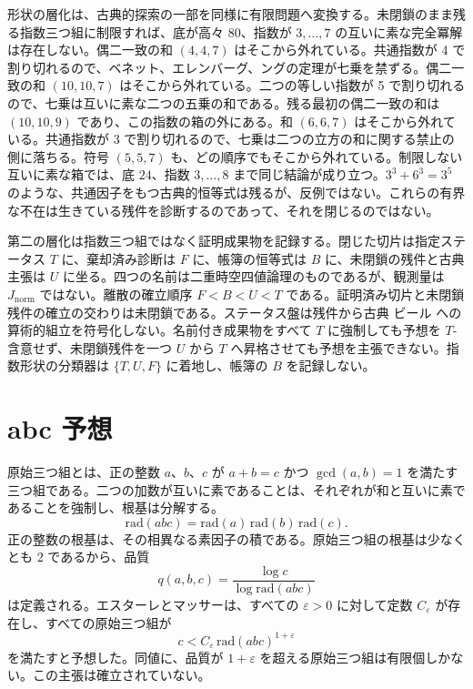 \documentclass[a4paper]{article}
\theoremstyle{definition}
\theoremstyle{remark}
\newcommand{\Jnorm}{J_{\mathrm{norm}}}
\begin{document}
形状の層化は、古典的探索の一部を同様に有限問題へ変換する。未閉鎖のまま残る指数三つ組に制限すれば、底が高々 \(80\)、指数が \(3,\ldots,7\) の互いに素な完全冪解は存在しない。偶二一致の和 \( (4,4,7) \) はそこから外れている。共通指数が 4 で割り切れるので、ベネット、エレンバーグ、ングの定理が七乗を禁ずる。偶二一致の和 \( (10,10,7) \) はそこから外れている。二つの等しい指数が 5 で割り切れるので、七乗は互いに素な二つの五乗の和である。残る最初の偶二一致の和は \( (10,10,9) \) であり、この指数の箱の外にある。和 \( (6,6,7) \) はそこから外れている。共通指数が 3 で割り切れるので、七乗は二つの立方の和に関する禁止の側に落ちる。符号 \( (5,5,7) \) も、どの順序でもそこから外れている。制限しない互いに素な箱では、底 \(24\)、指数 \(3,\ldots,8\) まで同じ結論が成り立つ。\(3^3+6^3=3^5\) のような、共通因子をもつ古典的恒等式は残るが、反例ではない。これらの有界な不在は生きている残件を診断するのであって、それを閉じるのではない。

第二の層化は指数三つ組ではなく証明成果物を記録する。閉じた切片は指定ステータス \( T \) に、棄却済み診断は \( F \) に、帳簿の恒等式は \( B \) に、未閉鎖の残件と古典主張は \( U \) に坐る。四つの名前は二重時空四値論理のものであるが、観測量は \( \Jnorm \) ではない。離散の確立順序 \( F<B<U<T \) である。証明済み切片と未閉鎖残件の確立の交わりは未閉鎖である。ステータス盤は残件から古典 ビール への算術的組立を符号化しない。名前付き成果物をすべて \( T \) に強制しても予想を \( T \)-含意せず、未閉鎖残件を一つ \( U \) から \( T \) へ昇格させても予想を主張できない。指数形状の分類器は \( \{T,U,F\} \) に着地し、帳簿の \( B \) を記録しない。

\section{abc 予想}

原始三つ組とは、正の整数 \(a\)、\(b\)、\(c\) が \(a+b=c\) かつ \(\gcd(a,b)=1\) を満たす三つ組である。二つの加数が互いに素であることは、それぞれが和と互いに素であることを強制し、根基は分解する。
\[
\mathrm{rad}(abc)=\mathrm{rad}(a)\,\mathrm{rad}(b)\,\mathrm{rad}(c).
\]
正の整数の根基は、その相異なる素因子の積である。原始三つ組の根基は少なくとも \(2\) であるから、品質
\[
q(a,b,c)=\frac{\log c}{\log\mathrm{rad}(abc)}
\]
は定義される。エスターレとマッサーは、すべての \(\varepsilon>0\) に対して定数 \(C_\varepsilon\) が存在し、すべての原始三つ組が
\[
c<C_\varepsilon\,\mathrm{rad}(abc)^{1+\varepsilon}
\]
を満たすと予想した。同値に、品質が \(1+\varepsilon\) を超える原始三つ組は有限個しかない。この主張は確立されていない。
\end{document}
